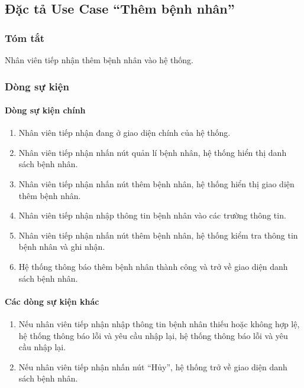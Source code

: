 \subsection{Đặc tả Use Case ``Thêm bệnh nhân''}

\subsubsection{Tóm tắt}
Nhân viên tiếp nhận thêm bệnh nhân vào hệ thống.

\subsubsection{Dòng sự kiện}
\paragraph{\textbf{Dòng sự kiện chính}}
\begin{enumerate}
  \item Nhân viên tiếp nhận đang ở giao diện chính của hệ thống.
  \item Nhân viên tiếp nhận nhấn nút quản lí bệnh nhân, hệ thống hiển thị danh sách bệnh nhân.
  \item Nhân viên tiếp nhận nhấn nút thêm bệnh nhân, hệ thống hiển thị giao diện thêm bệnh nhân.
  \item Nhân viên tiếp nhận nhập thông tin bệnh nhân vào các trường thông tin.
  \item Nhân viên tiếp nhận nhấn nút thêm bệnh nhân, hệ thống kiểm tra thông tin bệnh nhân và ghi nhận.
  \item Hệ thống thông báo thêm bệnh nhân thành công và trở về giao diện danh sách bệnh nhân.
\end{enumerate}

\paragraph{\textbf{Các dòng sự kiện khác}}
\begin{enumerate}
  \item Nếu nhân viên tiếp nhận nhập thông tin bệnh nhân thiếu hoặc không hợp lệ, hệ thống thông báo lỗi và yêu cầu nhập lại, hệ thống thông báo lỗi và yêu cầu nhập lại.
  \item Nếu nhân viên tiếp nhận nhấn nút ``Hủy'', hệ thống trở về giao diện danh sách bệnh nhân.
\end{enumerate}

